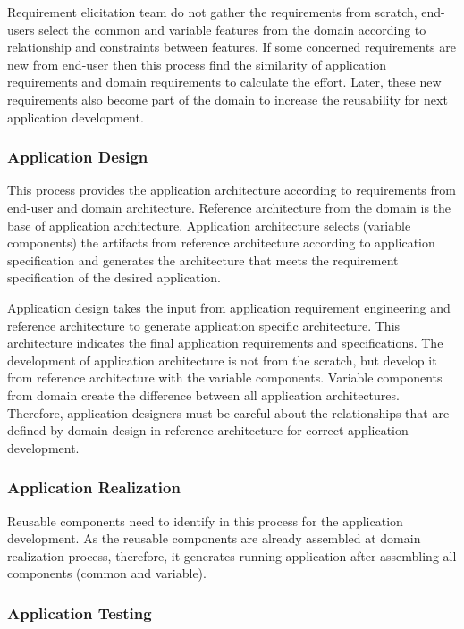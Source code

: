 Requirement elicitation team do not gather the requirements from scratch, end-users select the common and variable features from the domain according to relationship and constraints between features. If some concerned requirements are new from end-user then this process find the similarity of application requirements and domain requirements to calculate the effort. Later, these new requirements also become part of the domain to increase the reusability for next application development.

\subsubsection{Application Design}

This process provides the application architecture according to requirements from end-user and domain architecture. Reference architecture from the domain is the base of application architecture. Application architecture selects (variable components) the artifacts from reference architecture according to application specification and generates the architecture that meets the requirement specification of the desired application. 

Application design takes the input from application requirement engineering and reference architecture to generate application specific architecture. This architecture indicates the final application requirements and specifications. The development of application architecture is not from the scratch, but develop it from reference architecture with the variable components. Variable components from domain create the difference between all application architectures. Therefore, application designers must be careful about the relationships that are defined by domain design in reference architecture for correct application development.

\subsubsection{Application Realization}

Reusable components need to identify in this process for the application development. As the reusable components are already assembled at domain realization process, therefore, it generates running application after assembling all components (common and variable).

\subsubsection{Application Testing}

